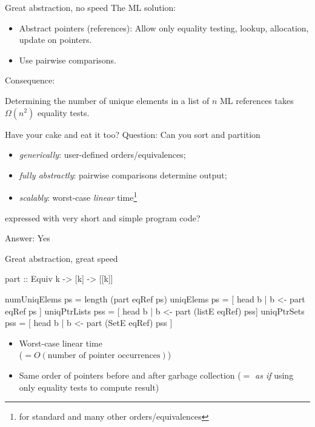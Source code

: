 \documentclass{beamer}
\begin{document}
\begin{frame}{Great abstraction, no speed}
  The ML solution:
  \begin{itemize}
  \item Abstract pointers (references): Allow only equality testing, lookup,
    allocation, update on pointers.
  \item Use pairwise comparisons.
  \end{itemize}
  Consequence:
  \begin{theorem}
    Determining the number of unique elements in a list of $n$ ML references
    takes $\Omega(n^2)$ equality tests.
  \end{theorem}
\end{frame}

\begin{frame}{Have your cake and eat it too?}
  Question: Can you sort and partition
  \begin{itemize}
  \item \emph{generically}: user-defined orders/equivalences;
  \item \emph{fully abstractly}: pairwise comparisons determine output;
  \item \emph{scalably}: worst-case \emph{linear}
    time\footnote{for standard and many other orders/equivalences}
  \end{itemize}
  expressed with very short and simple program code?

  \vspace{1cm}
  Answer: Yes
\end{frame}

\begin{frame}[fragile]{Great abstraction, great speed}
\begin{haskell}
part :: Equiv k -> [k] -> [[k]]

numUniqElems ps = length (part eqRef ps)
uniqElems ps = [ head b | b <- part eqRef ps ]
uniqPtrLists pss = [ head b | b <- part (listE eqRef) pss]
uniqPtrSets pss = [ head b | b <- part (SetE eqRef) pss ]
\end{haskell}
  \begin{itemize}
  \item Worst-case linear time\\
    ($= O(\textrm{number of pointer occurrences})$)
  \item Same order of pointers before and after garbage collection ($=$
    \emph{as if} using only equality tests to compute result)
  \end{itemize}
\end{frame}
\end{document}
